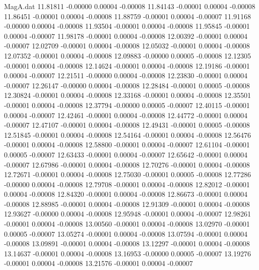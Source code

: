 \begin{filecontents}{MagA.dat}
  11.81811   -0.00000    0.00004   -0.00008
  11.84143   -0.00001    0.00004   -0.00008
  11.86451   -0.00001    0.00004   -0.00008
  11.88759   -0.00001    0.00004   -0.00007
  11.91168   -0.00000    0.00004   -0.00008
  11.93504   -0.00001    0.00004   -0.00008
  11.95845   -0.00001    0.00004   -0.00007
  11.98178   -0.00001    0.00004   -0.00008
  12.00392   -0.00001    0.00004   -0.00007
  12.02709   -0.00001    0.00004   -0.00008
  12.05032   -0.00001    0.00004   -0.00008
  12.07352   -0.00001    0.00004   -0.00008
  12.09883   -0.00000    0.00005   -0.00008
  12.12305   -0.00001    0.00004   -0.00008
  12.14624   -0.00001    0.00004   -0.00008
  12.19186   -0.00001    0.00004   -0.00007
  12.21511   -0.00000    0.00004   -0.00008
  12.23830   -0.00001    0.00004   -0.00007
  12.26147   -0.00000    0.00004   -0.00008
  12.28484   -0.00001    0.00005   -0.00008
  12.30824   -0.00001    0.00004   -0.00008
  12.33168   -0.00001    0.00004   -0.00008
  12.35501   -0.00001    0.00004   -0.00008
  12.37794   -0.00000    0.00005   -0.00007
  12.40115   -0.00001    0.00004   -0.00007
  12.42461   -0.00001    0.00004   -0.00008
  12.44772   -0.00001    0.00004   -0.00007
  12.47107   -0.00001    0.00004   -0.00008
  12.49431   -0.00001    0.00005   -0.00008
  12.51845   -0.00001    0.00004   -0.00008
  12.54164   -0.00001    0.00004   -0.00008
  12.56476   -0.00001    0.00004   -0.00008
  12.58800   -0.00001    0.00004   -0.00007
  12.61104   -0.00001    0.00005   -0.00007
  12.63433   -0.00001    0.00004   -0.00007
  12.65642   -0.00001    0.00004   -0.00007
  12.67986   -0.00001    0.00004   -0.00008
  12.70276   -0.00001    0.00004   -0.00008
  12.72671   -0.00001    0.00004   -0.00008
  12.75030   -0.00001    0.00005   -0.00008
  12.77286   -0.00000    0.00004   -0.00008
  12.79708   -0.00001    0.00004   -0.00008
  12.82012   -0.00001    0.00004   -0.00008
  12.84320   -0.00001    0.00004   -0.00008
  12.86673   -0.00001    0.00004   -0.00008
  12.88985   -0.00001    0.00004   -0.00008
  12.91309   -0.00001    0.00004   -0.00008
  12.93627   -0.00000    0.00004   -0.00008
  12.95948   -0.00001    0.00004   -0.00007
  12.98261   -0.00001    0.00004   -0.00008
  13.00560   -0.00001    0.00004   -0.00008
  13.02970   -0.00001    0.00005   -0.00007
  13.05274   -0.00001    0.00004   -0.00008
  13.07594   -0.00001    0.00004   -0.00008
  13.09891   -0.00001    0.00004   -0.00008
  13.12297   -0.00001    0.00004   -0.00008
  13.14637   -0.00001    0.00004   -0.00008
  13.16953   -0.00000    0.00005   -0.00007
  13.19276   -0.00001    0.00004   -0.00008
  13.21576   -0.00001    0.00004   -0.00007

\end{filecontents}
